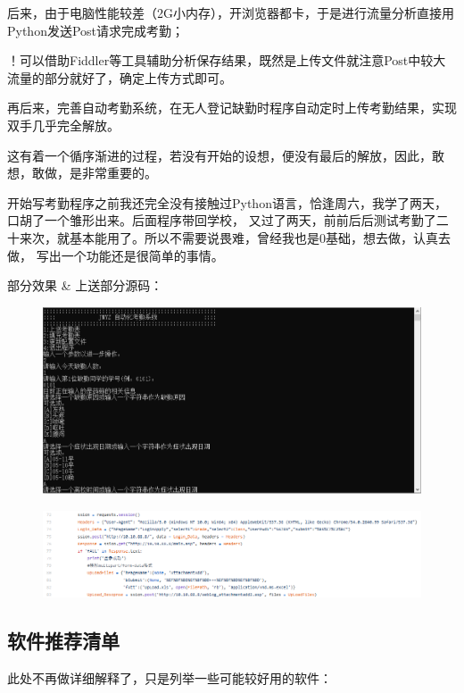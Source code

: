 \documentclass[a5paper]{article}
\begin{document}
        后来，由于电脑性能较差（2G小内存），开浏览器都卡，于是进行流量分析直接用Python发送Post请求完成考勤；

        ！可以借助Fiddler等工具辅助分析保存结果，既然是上传文件就注意Post中较大流量的部分就好了，确定上传方式即可。

        再后来，完善自动考勤系统，在无人登记缺勤时程序自动定时上传考勤结果，实现双手几乎完全解放。

        这有着一个循序渐进的过程，若没有开始的设想，便没有最后的解放，因此，敢想，敢做，是非常重要的。

        开始写考勤程序之前我还完全没有接触过Python语言，恰逢周六，我学了两天，口胡了一个雏形出来。后面程序带回学校，
        又过了两天，前前后后测试考勤了二十来次，就基本能用了。所以不需要说畏难，曾经我也是0基础，想去做，认真去做，
        写出一个功能还是很简单的事情。

        部分效果 \& 上送部分源码：

        \begin{figure}[htbp]
        \centering
        \includegraphics[scale=0.30]{2.3-p3.png}
        \end{figure}

        \begin{figure}[htbp]
        \centering
        \includegraphics[scale=0.30]{2.3-p2.png}
        \end{figure}

        \subsection{软件推荐清单}
        此处不再做详细解释了，只是列举一些可能较好用的软件：
\end{document}
